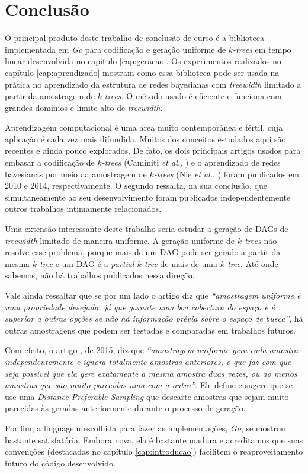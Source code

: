 \chapter{Conclusão}
\label{cap:conclusao}

O principal produto deste trabalho de conclusão de curso é a biblioteca implementada em \emph{Go} para codificação e geração uniforme de \emph{$k$-trees} em tempo linear desenvolvida no capítulo \ref{cap:geracao}. Os experimentos realizados no capítulo \ref{cap:aprendizado} mostram como essa biblioteca pode ser usada na prática no aprendizado da estrutura de redes bayesianas com \emph{treewidth} limitado a partir da amostragem de \emph{$k$-trees}. O método usado é eficiente e funciona com grandes domínios e limite alto de \emph{treewidth}.

Aprendizagem computacional é uma área muito contemporânea e fértil, cuja aplicação é cada vez mais difundida. Muitos dos conceitos estudados aqui são recentes e ainda pouco explorados. De fato, os dois principais artigos usados para embasar a codificação de \emph{$k$-trees} (Caminiti \emph{et al.}, \cite{caminiti}) e o aprendizado de redes bayesianas por meio da amostragem de \emph{$k$-trees} (Nie \emph{et al.}, \cite{maua}) foram publicados em 2010 e 2014, respectivamente. O segundo ressalta, na sua conclusão, que simultaneamente ao seu desenvolvimento foram publicados independentemente outros trabalhos intimamente relacionados.

Uma extensão interessante deste trabalho seria estudar a geração de DAGs de \emph{treewidth} limitado de maneira uniforme. A geração uniforme de \emph{$k$-trees} não resolve esse problema, porque mais de um DAG pode ser gerado a partir da mesma \emph{$k$-tree} e um DAG é a \emph{partial $k$-tree} de mais de uma \emph{$k$-tree}. Até onde sabemos, não há trabalhos publicados nessa direção.

Vale ainda ressaltar que se por um lado o artigo \cite{maua} diz que \emph{``amostragem uniforme é uma propriedade desejada, já que garante uma boa cobertura do espaço e é superior a outras opções se não há informação prévia sobre o espaço de busca''}, há outras amostragens que podem ser testadas e comparadas em trabalhos futuros.

Com efeito, o artigo \cite{nie}, de 2015, diz que \emph{``amostragem uniforme gera cada amostra independentemente e ignora totalmente amostras anteriores, o que faz com que seja possível que ela gere exatamente a mesma amostra duas vezes, ou ao menos amostras que são muito parecidas uma com a outra''}. Ele define e sugere que se use uma \emph{Distance Preferable Sampling} que descarte amostras que sejam muito parecidas às geradas anteriormente durante o processo de geração.

Por fim, a linguagem escolhida para fazer as implementações, \emph{Go}, se mostrou bastante satisfatória. Embora nova, ela é bastante madura e acreditamos que suas convenções (destacadas no capítulo \ref{cap:introducao}) facilitem o reaproveitamento futuro do código desenvolvido.
